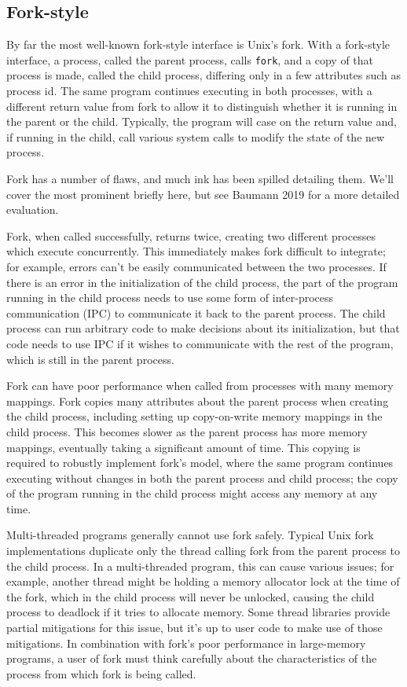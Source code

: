 \documentclass[sigplan]{acmart}
\begin{document}
\subsection{Fork-style}
By far the most well-known fork-style interface is Unix's fork.\cite{forkhist}
With a fork-style interface,
a process, called the parent process, calls \texttt{fork},
and a copy of that process is made,
called the child process,
differing only in a few attributes such as process id.
The same program continues executing in both processes,
with a different return value from fork to allow it to distinguish whether it is running in the parent or the child.
Typically, the program will case on the return value
and, if running in the child,
call various system calls to modify the state of the new process.

Fork has a number of flaws,
and much ink has been spilled detailing them.
We'll cover the most prominent briefly here,
but see Baumann 2019 \cite{forkroad} for a more detailed evaluation.

Fork, when called successfully, returns twice,
creating two different processes which execute concurrently.
This immediately makes fork difficult to integrate;
for example, errors can't be easily communicated between the two processes.
If there is an error in the initialization of the child process,
the part of the program running in the child process
needs to use some form of inter-process communication (IPC) to communicate it back to the parent process.
The child process can run arbitrary code to make decisions about its initialization,
but that code needs to use IPC if it wishes to communicate with the rest of the program,
which is still in the parent process.

Fork can have poor performance when called from processes with many memory mappings.\cite{forkroad}
Fork copies many attributes about the parent process when creating the child process,
including setting up copy-on-write memory mappings in the child process.
This becomes slower as the parent process has more memory mappings,
eventually taking a significant amount of time.
This copying is required to robustly implement fork's model,
where the same program continues executing without changes in both the parent process and child process;
the copy of the program running in the child process might access any memory at any time.

Multi-threaded programs generally cannot use fork safely.
Typical Unix fork implementations duplicate only the thread calling fork from the parent process to the child process.
In a multi-threaded program, this can cause various issues;
for example, another thread might be holding a memory allocator lock at the time of the fork,
which in the child process will never be unlocked,
causing the child process to deadlock if it tries to allocate memory.
Some thread libraries provide partial mitigations for this issue,
but it's up to user code to make use of those mitigations.\cite{pthread_atfork}
In combination with fork's poor performance in large-memory programs,
a user of fork must think carefully
about the characteristics of the process from which fork is being called.
\end{document}
